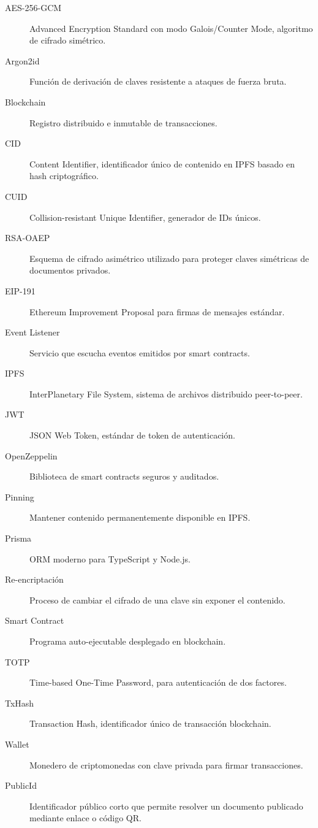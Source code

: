 \documentclass[11pt, a4paper]{article}
\begin{document}
{\begin{description}
    \item[AES-256-GCM] Advanced Encryption Standard con modo Galois/Counter Mode, algoritmo de cifrado simétrico.
    \item[Argon2id] Función de derivación de claves resistente a ataques de fuerza bruta.
    \item[Blockchain] Registro distribuido e inmutable de transacciones.
    \item[CID] Content Identifier, identificador único de contenido en IPFS basado en hash criptográfico.
    \item[CUID] Collision-resistant Unique Identifier, generador de IDs únicos.
    \item[RSA-OAEP] Esquema de cifrado asimétrico utilizado para proteger claves simétricas de documentos privados.
    \item[EIP-191] Ethereum Improvement Proposal para firmas de mensajes estándar.
    \item[Event Listener] Servicio que escucha eventos emitidos por smart contracts.
    \item[IPFS] InterPlanetary File System, sistema de archivos distribuido peer-to-peer.
    \item[JWT] JSON Web Token, estándar de token de autenticación.
    \item[OpenZeppelin] Biblioteca de smart contracts seguros y auditados.
    \item[Pinning] Mantener contenido permanentemente disponible en IPFS.
    \item[Prisma] ORM moderno para TypeScript y Node.js.
    \item[Re-encriptación] Proceso de cambiar el cifrado de una clave sin exponer el contenido.
    \item[Smart Contract] Programa auto-ejecutable desplegado en blockchain.
    \item[TOTP] Time-based One-Time Password, para autenticación de dos factores.
    \item[TxHash] Transaction Hash, identificador único de transacción blockchain.
    \item[Wallet] Monedero de criptomonedas con clave privada para firmar transacciones.
    \item[PublicId] Identificador público corto que permite resolver un documento publicado mediante enlace o código QR.
\end{description}

}
\end{document}
